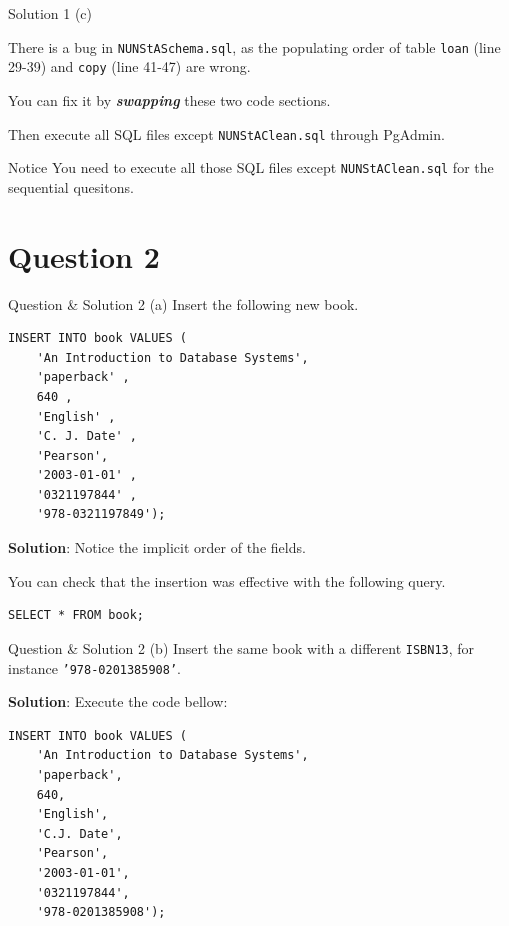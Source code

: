 \begin{frame}[fragile]{Solution 1 (c)}

There is a bug in \texttt{NUNStASchema.sql}, as the populating order of table \texttt{loan} (line 29-39) and \texttt{copy} (line 41-47) are wrong. \vspace{10pt}

You can fix it by \textbf{\textit{swapping}} these two code sections.\vspace{10pt}

Then execute all SQL files except \texttt{NUNStAClean.sql} through PgAdmin.

\begin{alertblock}{Notice}
You need to execute all those SQL files except \texttt{NUNStAClean.sql} for the sequential quesitons.
\end{alertblock}
\end{frame}

\section*{Question 2}

\begin{frame}[fragile]{Question \& Solution 2 (a)}
Insert the following new book.

\begin{lstlisting}
INSERT INTO book VALUES (
	'An Introduction to Database Systems',
	'paperback' , 
	640 , 
	'English' , 
	'C. J. Date' , 
	'Pearson',
	'2003-01-01' , 
	'0321197844' , 
	'978-0321197849');
\end{lstlisting} 


\textbf{Solution}: Notice the implicit order of the fields.

You can check that the insertion was effective with the following query.
\begin{lstlisting}
SELECT * FROM book;
\end{lstlisting}

\end{frame}

\begin{frame}[fragile]{Question \& Solution 2 (b)}
Insert the same book with a different \texttt{ISBN13}, for instance \texttt{'978-0201385908'}. \vspace{10pt}

\textbf{Solution}: Execute the code bellow:

\begin{lstlisting}
INSERT INTO book VALUES (
	'An Introduction to Database Systems', 
	'paperback', 
	640,
	'English',
	'C.J. Date', 
	'Pearson', 
	'2003-01-01', 
	'0321197844',  
	'978-0201385908');
\end{lstlisting}

\end{frame}

